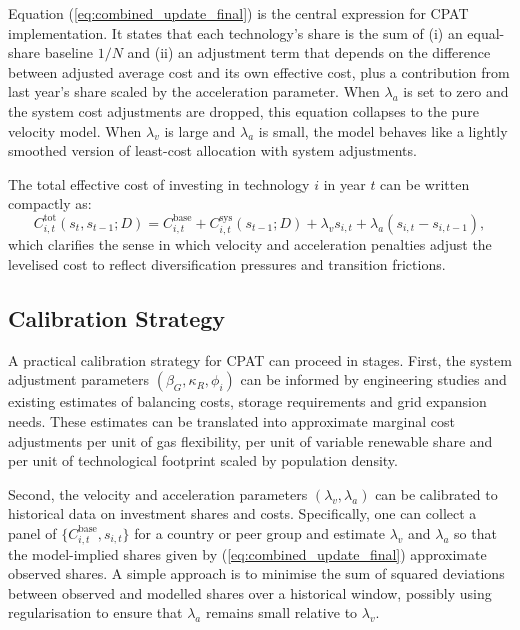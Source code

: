 \documentclass[preprint,authoryear,12pt]{elsarticle}
\begin{document}
Equation (\ref{eq:combined_update_final}) is the central expression for CPAT implementation. It
states that each technology’s share is the sum of (i) an equal-share baseline $1/N$ and (ii) an
adjustment term that depends on the difference between adjusted average cost and its own
effective cost, plus a contribution from last year’s share scaled by the acceleration parameter.
When $\lambda_a$ is set to zero and the system cost adjustments are dropped, this equation
collapses to the pure velocity model. When $\lambda_v$ is large and $\lambda_a$ is small, the
model behaves like a lightly smoothed version of least-cost allocation with system adjustments.

The total effective cost of investing in technology $i$ in year $t$ can be written compactly as:
\begin{equation}
    C_{i,t}^{\text{tot}}(s_t,s_{t-1};D)
    = C_{i,t}^{\text{base}}
      + C_{i,t}^{\text{sys}}(s_{t-1};D)
      + \lambda_v s_{i,t}
      + \lambda_a (s_{i,t} - s_{i,t-1}),
    \label{eq:total_LCOE}
\end{equation}
which clarifies the sense in which velocity and acceleration penalties adjust the levelised cost to
reflect diversification pressures and transition frictions.

\subsection{Calibration Strategy}

A practical calibration strategy for CPAT can proceed in stages. First, the system adjustment
parameters $(\beta_G, \kappa_R, \phi_i)$ can be informed by engineering studies and existing
estimates of balancing costs, storage requirements and grid expansion needs. These estimates can
be translated into approximate marginal cost adjustments per unit of gas flexibility, per unit of
variable renewable share and per unit of technological footprint scaled by population density.

Second, the velocity and acceleration parameters $(\lambda_v, \lambda_a)$ can be calibrated to
historical data on investment shares and costs. Specifically, one can collect a panel of
$\{C^{\text{base}}_{i,t}, s_{i,t}\}$ for a country or peer group and estimate $\lambda_v$ and
$\lambda_a$ so that the model-implied shares given by (\ref{eq:combined_update_final})
approximate observed shares. A simple approach is to minimise the sum of squared deviations
between observed and modelled shares over a historical window, possibly using regularisation to
ensure that $\lambda_a$ remains small relative to $\lambda_v$.
\end{document}
